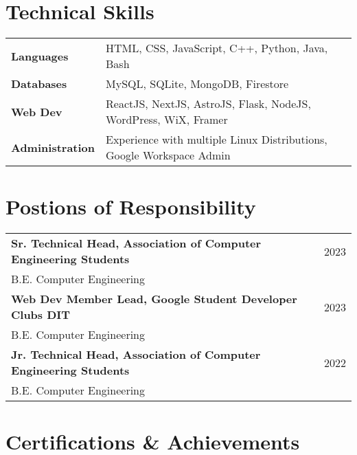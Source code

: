 \documentclass[a4paper,10pt]{article}
\begin{document}
\section{Technical Skills}
\begin{tabularx}{\linewidth}{@{}l X@{}}
\textbf{Languages} &  \normalsize{HTML, CSS, JavaScript, C++, Python, Java, Bash}\\
\textbf{Databases} &  \normalsize{MySQL, SQLite, MongoDB, Firestore}\\
\textbf{Web Dev}  &  \normalsize{ReactJS, NextJS, AstroJS, Flask, NodeJS, WordPress, WiX, Framer}\\
\textbf{Administration} & \normalsize{Experience with multiple Linux Distributions, Google Workspace Admin}\\
\end{tabularx}

\section{Postions of Responsibility}

\begin{tabularx}{\linewidth}{@{}l X@{}}	

\textbf{Sr. Technical Head, Association of Computer Engineering Students} & \hfill 
2023 \\ \vspace*{1mm}
B.E. Computer Engineering \\ 

\textbf{Web Dev Member Lead, Google Student Developer Clubs DIT} & \hfill 
2023 \\ \vspace*{1mm}
B.E. Computer Engineering \\ 

\textbf{Jr. Technical Head, Association of Computer Engineering Students} & \hfill 
2022 \\ 
B.E. Computer Engineering \\ 

\end{tabularx}

\section{Certifications \& Achievements}
\end{document}
